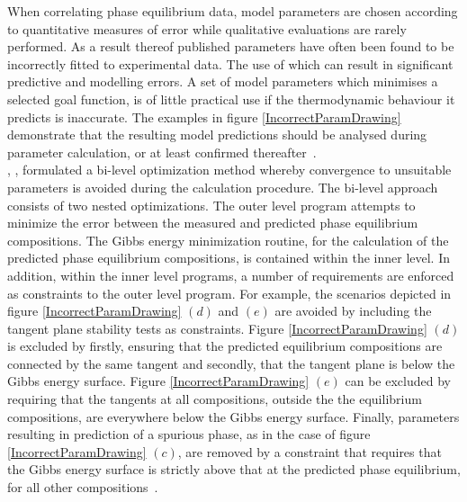 When correlating phase equilibrium data, model parameters are chosen according to quantitative measures of error while qualitative evaluations are rarely performed. As a result thereof published parameters have often been found to be incorrectly fitted to experimental data. The use of which can result in significant predictive and modelling errors. A set of model parameters which minimises a selected goal function, is of little practical use if the thermodynamic behaviour it predicts is inaccurate. The examples in figure \ref{IncorrectParamDrawing} demonstrate that the resulting model predictions should be analysed during parameter calculation, or at least confirmed thereafter~\cite{BilevelOptimization, BilevelOptimization2, ReliableComputationBinaryParams}.\\

\citeauthor{BilevelOptimization2}, \citeyear{BilevelOptimization2}, formulated a bi-level optimization method whereby convergence to unsuitable parameters is avoided during the calculation procedure. The bi-level approach consists of two nested optimizations. The outer level program attempts to minimize the error between the measured and predicted phase equilibrium compositions. The Gibbs energy minimization routine, for the calculation of the predicted phase equilibrium compositions, is contained within the inner level. In addition, within the inner level programs, a number of requirements are enforced as constraints to the outer level program. For example, the scenarios depicted in figure \ref{IncorrectParamDrawing} $\left(d\right)$ and $\left(e\right)$ are avoided by including the tangent plane stability tests as constraints. Figure \ref{IncorrectParamDrawing} $\left(d\right)$ is excluded by firstly, ensuring that the predicted equilibrium compositions are connected by the same tangent and secondly, that the tangent plane is below the Gibbs energy surface. Figure \ref{IncorrectParamDrawing} $\left(e\right)$ can be excluded by requiring that the tangents at all compositions, outside the the equilibrium compositions, are everywhere below the Gibbs energy surface. Finally, parameters resulting in prediction of a spurious phase, as in the case of figure \ref{IncorrectParamDrawing} $\left(c\right)$, are removed by a constraint that requires that the Gibbs energy surface is strictly above that at the predicted phase equilibrium, for all other compositions~\cite{BilevelOptimization2}.\\

